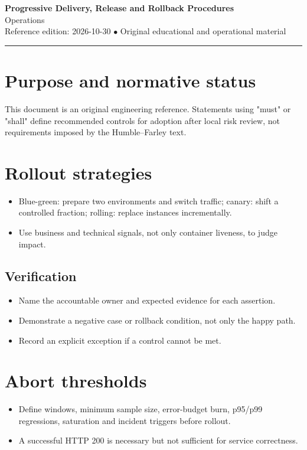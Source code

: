 \documentclass[10pt,letterpaper]{article}
\begin{document}
\begin{center}
{\LARGE\bfseries\color{cdblue}Progressive Delivery, Release and Rollback Procedures}\\[7pt]
{\large Operations}\\[6pt]
{\small Reference edition: 2026-10-30 $\bullet$ Original educational and operational material}
\end{center}
\noindent\color{cdblue}\rule{\linewidth}{1.2pt}\color{black}
\vspace{0.4em}
\section{Purpose and normative status}
This document is an original engineering reference. Statements using "must" or "shall" define recommended controls for adoption after local risk review, not requirements imposed by the Humble--Farley text.


\section{Rollout strategies}
\begin{itemize}
\item Blue-green: prepare two environments and switch traffic; canary: shift a controlled fraction; rolling: replace instances incrementally.
\item Use business and technical signals, not only container liveness, to judge impact.
\end{itemize}
\subsection{Verification}
\begin{itemize}
\item Name the accountable owner and expected evidence for each assertion.
\item Demonstrate a negative case or rollback condition, not only the happy path.
\item Record an explicit exception if a control cannot be met.
\end{itemize}


\section{Abort thresholds}
\begin{itemize}
\item Define windows, minimum sample size, error-budget burn, p95/p99 regressions, saturation and incident triggers before rollout.
\item A successful HTTP 200 is necessary but not sufficient for service correctness.
\end{itemize}
\end{document}
